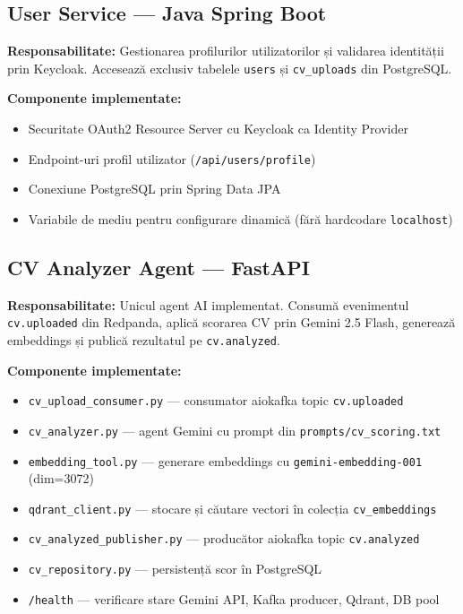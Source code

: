 \documentclass[12pt, a4paper]{report}
\begin{document}
\subsection{User Service — Java Spring Boot}

\textbf{Responsabilitate:} Gestionarea profilurilor utilizatorilor și validarea identității
prin Keycloak. Accesează exclusiv tabelele \texttt{users} și \texttt{cv\_uploads} din PostgreSQL.

\textbf{Componente implementate:}
\begin{itemize}[leftmargin=*]
  \item Securitate OAuth2 Resource Server cu Keycloak ca Identity Provider
  \item Endpoint-uri profil utilizator (\texttt{/api/users/profile})
  \item Conexiune PostgreSQL prin Spring Data JPA
  \item Variabile de mediu pentru configurare dinamică (fără hardcodare \texttt{localhost})
\end{itemize}

\subsection{CV Analyzer Agent — FastAPI}

\textbf{Responsabilitate:} Unicul agent AI implementat. Consumă evenimentul \texttt{cv.uploaded}
din Redpanda, aplică scorarea CV prin Gemini 2.5 Flash, generează embeddings și publică
rezultatul pe \texttt{cv.analyzed}.

\textbf{Componente implementate:}
\begin{itemize}[leftmargin=*]
  \item \texttt{cv\_upload\_consumer.py} — consumator aiokafka topic \texttt{cv.uploaded}
  \item \texttt{cv\_analyzer.py} — agent Gemini cu prompt din \texttt{prompts/cv\_scoring.txt}
  \item \texttt{embedding\_tool.py} — generare embeddings cu \texttt{gemini-embedding-001} (dim=3072)
  \item \texttt{qdrant\_client.py} — stocare și căutare vectori în colecția \texttt{cv\_embeddings}
  \item \texttt{cv\_analyzed\_publisher.py} — producător aiokafka topic \texttt{cv.analyzed}
  \item \texttt{cv\_repository.py} — persistență scor în PostgreSQL
  \item \texttt{/health} — verificare stare Gemini API, Kafka producer, Qdrant, DB pool
\end{itemize}
\end{document}
